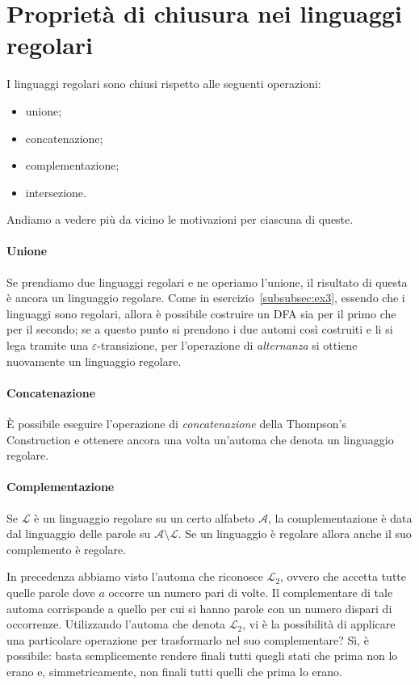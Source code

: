 \documentclass[class=book, crop=false, oneside, 12pt]{standalone}
\begin{document}
\section{Proprietà di chiusura nei linguaggi regolari}

I linguaggi regolari sono chiusi rispetto alle seguenti operazioni:
\begin{itemize}
	\item unione;
	\item concatenazione;
	\item complementazione;
	\item intersezione.
\end{itemize}
Andiamo a vedere più da vicino le motivazioni per ciascuna di queste.

\paragraph{Unione}
Se prendiamo due linguaggi regolari e ne operiamo l'unione, il risultato di questa è ancora un linguaggio regolare. Come in esercizio~\ref{subsubsec:ex3}, essendo che i linguaggi sono regolari, allora è possibile costruire un DFA sia per il primo che per il secondo; se a questo punto si prendono i due automi così costruiti e li si lega tramite una \(\varepsilon\)-transizione, per l'operazione di \emph{alternanza} si ottiene nuovamente 
un linguaggio regolare.

\paragraph{Concatenazione}
È possibile eseguire l'operazione di \emph{concatenazione} della Thompson's Construction e ottenere ancora una volta un'automa che denota un linguaggio regolare.

\paragraph{Complementazione}
Se \(\mathcal{L}\) è un linguaggio regolare su un certo alfabeto \(\mathcal{A}\), la complementazione è data dal linguaggio delle parole su \(\mathcal{A} \setminus \mathcal{L}\). Se un linguaggio è regolare allora anche il suo complemento è regolare. 

In precedenza abbiamo visto l'automa che riconosce \(\mathcal{L}_2\), ovvero che accetta tutte quelle parole dove \(a\) occorre un numero pari di volte. Il complementare di tale automa corrisponde a quello per cui si hanno parole con un numero dispari di occorrenze. Utilizzando l'automa che denota \(\mathcal{L}_2\), vi è la possibilità di applicare una particolare operazione per trasformarlo nel suo complementare? Sì, è possibile: basta semplicemente rendere finali tutti quegli stati che prima non lo erano e, simmetricamente, non finali tutti quelli che prima lo erano.
\end{document}
